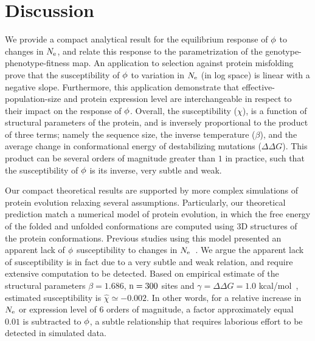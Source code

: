 \section{Discussion}

We provide a compact analytical result for the equilibrium response of $\phi$ to changes in $N_{\mathrm{e}}$, and relate this response to the parametrization of the genotype-phenotype-fitness map.
An application to selection against protein misfolding prove that the susceptibility of $\phi$ to variation in $N_{\mathrm{e}}$ (in log space) is linear with a negative slope.
Furthermore, this application demonstrate that \gls{effective-population-size} and protein expression level are interchangeable in respect to their impact on the response of $\phi$.
Overall, the susceptibility ($\chi$), is a function of structural parameters of the protein, and is inversely proportional to the product of three terms; namely the sequence size, the inverse temperature ($\beta$), and the average change in conformational energy of destabilizing mutations ($\Delta \Delta G$).
This product can be several orders of magnitude greater than $1$ in practice, such that the susceptibility of $\phi$ is its inverse, very subtle and weak.


Our compact theoretical results are supported by more complex simulations of protein evolution relaxing several assumptions.
Particularly, our theoretical prediction match a numerical model of protein evolution, in which the free energy of the folded and unfolded conformations are computed using $3$D structures of the protein conformations.
Previous studies using this model presented an apparent lack of $\phi$ susceptibility to changes in $N_{\mathrm{e}}$~\citep{Goldstein2013}.
We argue the apparent lack of susceptibility is in fact due to a very subtle and weak relation, and require extensive computation to be detected.
Based on empirical estimate of the structural parameters $\beta = 1.686$, $\text{n}=300$ sites and $\gamma=\Delta \Delta G = 1.0$ kcal/mol~\citep{Zeldovich2007}, estimated susceptibility is $\hat{\chi} \simeq -0.002$.
In other words, for a relative increase in $N_{\mathrm{e}}$ or expression level of $6$ orders of magnitude, a factor approximately equal $0.01$ is subtracted to $\phi$, a subtle relationship that requires laborious effort to be detected in simulated data.

